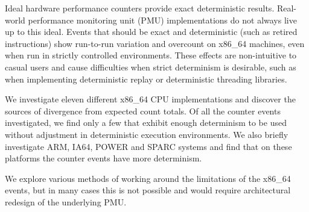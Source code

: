 Ideal hardware performance counters provide exact deterministic results.
Real-world performance monitoring unit (PMU) implementations
do not always live up to this ideal.
Events that should be exact and deterministic 
(such as retired instructions) show run-to-run 
variation and overcount on x86\_64 machines, even when 
run in strictly controlled environments. 
These effects are non-intuitive to casual users and 
cause difficulties when strict determinism is desirable,
such as when implementing
deterministic replay or deterministic threading libraries.

We investigate eleven different x86\_64 CPU implementations and
discover the sources of divergence from expected count totals.  
Of all the counter events investigated, we find only a few
that exhibit enough determinism to be used without adjustment in
deterministic execution environments.  
We also briefly investigate ARM, IA64, POWER and SPARC systems
and find that on these platforms the counter events have more
determinism.  

We explore various methods of working around the limitations 
of the x86\_64 events, but in many cases this is not possible
and would require architectural redesign of the underlying
PMU.

